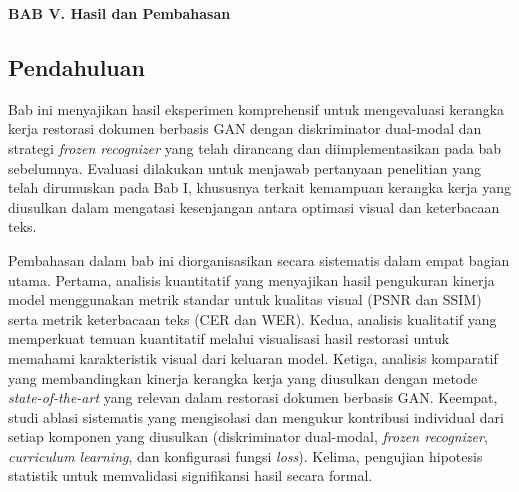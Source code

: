 \documentclass[12pt,a4paper]{article}
\begin{document}

\vspace{2cm}
\begin{center}
{\fontsize{14}{16.8}\selectfont\textbf{BAB V. Hasil dan Pembahasan}}\\[1em]
\end{center}
\label{sec:hasil-dan-pembahasan}
\setcounter{section}{5}
\setcounter{subsection}{0}
\vspace{2em}

\subsection{Pendahuluan}
\label{subsec:hasil-pendahuluan}
\vspace{0.8em}

Bab ini menyajikan hasil eksperimen komprehensif untuk mengevaluasi kerangka kerja restorasi dokumen berbasis GAN dengan diskriminator dual-modal dan strategi \textit{frozen recognizer} yang telah dirancang dan diimplementasikan pada bab sebelumnya. Evaluasi dilakukan untuk menjawab pertanyaan penelitian yang telah dirumuskan pada Bab I, khususnya terkait kemampuan kerangka kerja yang diusulkan dalam mengatasi kesenjangan antara optimasi visual dan keterbacaan teks.

\vspace{0.8em}

Pembahasan dalam bab ini diorganisasikan secara sistematis dalam empat bagian utama. Pertama, analisis kuantitatif yang menyajikan hasil pengukuran kinerja model menggunakan metrik standar untuk kualitas visual (PSNR dan SSIM) serta metrik keterbacaan teks (CER dan WER). Kedua, analisis kualitatif yang memperkuat temuan kuantitatif melalui visualisasi hasil restorasi untuk memahami karakteristik visual dari keluaran model. Ketiga, analisis komparatif yang membandingkan kinerja kerangka kerja yang diusulkan dengan metode \textit{state-of-the-art} yang relevan dalam restorasi dokumen berbasis GAN. Keempat, studi ablasi sistematis yang mengisolasi dan mengukur kontribusi individual dari setiap komponen yang diusulkan (diskriminator dual-modal, \textit{frozen recognizer}, \textit{curriculum learning}, dan konfigurasi fungsi \textit{loss}). Kelima, pengujian hipotesis statistik untuk memvalidasi signifikansi hasil secara formal.
\end{document}
